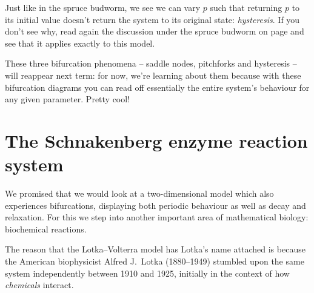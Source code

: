\documentclass[main.tex]{subfiles}
\begin{document}
Just like in the spruce budworm, we see we can vary $p$ such that returning $p$ to its initial value doesn't return the system to its original state: \emph{hysteresis}. If you don't see why, read again the discussion under the spruce budworm on page \pageref{para:discussion-on-jumps} and see that it applies exactly to this model.

These three bifurcation phenomena -- saddle nodes, pitchforks and hysteresis -- will reappear next term: for now, we're learning about them because with these bifurcation diagrams you can read off essentially the entire system's behaviour for any given parameter. Pretty cool!

\section{The Schnakenberg enzyme reaction system}
We promised that we would look at a two-dimensional model which also experiences bifurcations, displaying both periodic behaviour as well as decay and relaxation. For this we step into another important area of mathematical biology: biochemical reactions.

The reason that the Lotka--Volterra model has Lotka's name attached is because the American biophysicist Alfred J.\ Lotka (1880--1949) stumbled upon the same system independently between 1910 and 1925, initially in the context of how \emph{chemicals} interact. 

\end{document}
